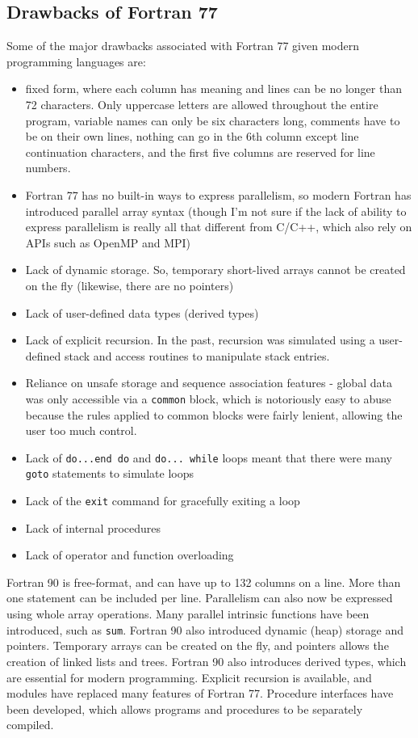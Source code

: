 \documentclass[10pt]{article}
\begin{document}
\subsection{Drawbacks of Fortran 77}

Some of the major drawbacks associated with Fortran 77 given modern programming languages are:

\begin{itemize}
\item fixed form, where each column has meaning and lines can be no longer than 72 characters. Only uppercase letters are allowed throughout the entire program, variable names can only be six characters long, comments have to be on their own lines, nothing can go in the 6th column except line continuation characters, and the first five columns are reserved for line numbers.
\item Fortran 77 has no built-in ways to express parallelism, so modern Fortran has introduced parallel array syntax (though I'm not sure if the lack of ability to express parallelism is really all that different from C/C++, which also rely on APIs such as OpenMP and MPI)
\item Lack of dynamic storage. So, temporary short-lived arrays cannot be created on the fly (likewise, there are no pointers)
\item Lack of user-defined data types (derived types)
\item Lack of explicit recursion. In the past, recursion was simulated using a user-defined stack and access routines to manipulate stack entries.
\item Reliance on unsafe storage and sequence association features - global data was only accessible via a {\tt common} block, which is notoriously easy to abuse because the rules applied to common blocks were fairly lenient, allowing the user too much control. 
\item Lack of {\tt do...end do} and {\tt do... while} loops meant that there were many {\tt goto} statements to simulate loops
\item Lack of the {\tt exit} command for gracefully exiting a loop
\item Lack of internal procedures
\item Lack of operator and function overloading
\end{itemize}

Fortran 90 is free-format, and can have up to 132 columns on a line. More than one statement can be included per line. Parallelism can also now be expressed using whole array operations. Many parallel intrinsic functions have been introduced, such as {\tt sum}. Fortran 90 also introduced dynamic (heap) storage and pointers. Temporary arrays can be created on the fly, and pointers allows the creation of linked lists and trees. Fortran 90 also introduces derived types, which are essential for modern programming. Explicit recursion is available, and modules have replaced many features of Fortran 77. Procedure interfaces have been developed, which allows programs and procedures to be separately compiled. 
\end{document}

